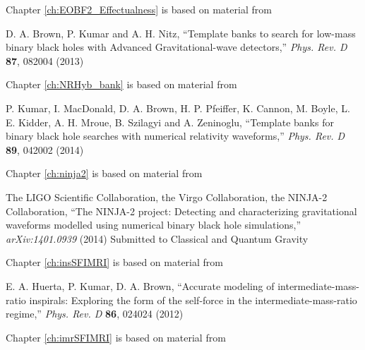 \documentclass[12pt,notitlepage]{report}
\begin{document}
\vspace*{0.5cm}

\noindent Chapter \ref{ch:EOBF2_Effectualness} is based on material from

\vspace*{0.25cm}

\noindent D. A. Brown, P. Kumar and A. H. Nitz, ``Template banks to 
search for low-mass binary black holes with Advanced Gravitational-wave 
detectors,''
{\it Phys. Rev. D} {\bf 87}, 082004 (2013)

\vspace*{0.5cm}

\noindent Chapter \ref{ch:NRHyb_bank} is based on material from

\vspace*{0.25cm}

\noindent P. Kumar, I. MacDonald, D. A. Brown, H. P. Pfeiffer, K. Cannon,
M. Boyle, L. E. Kidder, A. H. Mroue, B. Szilagyi and A. Zeninoglu, 
``Template banks for binary black hole searches with numerical relativity
waveforms,''
{\it Phys. Rev. D} {\bf 89}, 042002 (2014)

\vspace*{0.5cm}

\noindent Chapter \ref{ch:ninja2} is based on material from

\vspace*{0.25cm}

\noindent The LIGO Scientific Collaboration, the Virgo Collaboration, 
the NINJA-2 Collaboration, ``The NINJA-2 project: 
Detecting and characterizing gravitational waveforms modelled using 
numerical binary black hole simulations,''
{\it arXiv:1401.0939} (2014) {\rm Submitted to Classical and Quantum Gravity}

\vspace*{0.5cm}

\noindent Chapter \ref{ch:insSFIMRI} is based on material from

\vspace*{0.25cm}

\noindent E. A. Huerta, P. Kumar, D. A. Brown, 
``Accurate modeling of intermediate-mass-ratio inspirals:
Exploring the form of the self-force in the intermediate-mass-ratio regime,''
{\it Phys. Rev. D} {\bf 86}, 024024 (2012)

\vspace*{0.5cm}

\noindent Chapter \ref{ch:imrSFIMRI} is based on material from

\vspace*{0.25cm}
\end{document}

